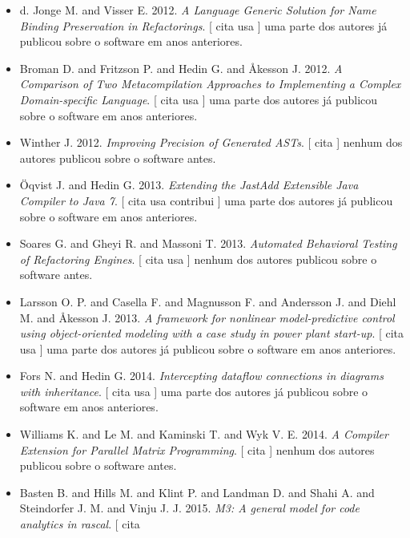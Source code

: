 \begin{itemize}
\item d. Jonge M. and Visser E.
      2012.
        \textit{ A Language Generic Solution for Name Binding Preservation in Refactorings}.
      [
          cita
          usa
      ]
uma parte dos autores já publicou sobre o software em anos anteriores.
\item Broman D. and Fritzson P. and Hedin G. and Åkesson J.
      2012.
        \textit{ A Comparison of Two Metacompilation Approaches to Implementing a Complex Domain-specific Language}.
      [
          cita
          usa
      ]
uma parte dos autores já publicou sobre o software em anos anteriores.
\item Winther J.
      2012.
        \textit{ Improving Precision of Generated ASTs}.
      [
          cita
      ]
nenhum dos autores publicou sobre o software antes.
\item \"{O}qvist J. and Hedin G.
      2013.
        \textit{ Extending the JastAdd Extensible Java Compiler to Java 7}.
      [
          cita
          usa
          contribui
      ]
uma parte dos autores já publicou sobre o software em anos anteriores.
\item Soares G. and Gheyi R. and Massoni T.
      2013.
        \textit{ Automated Behavioral Testing of Refactoring Engines}.
      [
          cita
          usa
      ]
nenhum dos autores publicou sobre o software antes.
\item Larsson O. P. and Casella F. and Magnusson F. and Andersson J. and Diehl M. and Åkesson J.
      2013.
        \textit{ A framework for nonlinear model-predictive control using object-oriented modeling with a case study in power plant start-up}.
      [
          cita
          usa
      ]
uma parte dos autores já publicou sobre o software em anos anteriores.
\item Fors N. and Hedin G.
      2014.
        \textit{ Intercepting dataflow connections in diagrams with inheritance}.
      [
          cita
          usa
      ]
uma parte dos autores já publicou sobre o software em anos anteriores.
\item Williams K. and Le M. and Kaminski T. and Wyk V. E.
      2014.
        \textit{ A Compiler Extension for Parallel Matrix Programming}.
      [
          cita
      ]
nenhum dos autores publicou sobre o software antes.
\item Basten B. and Hills M. and Klint P. and Landman D. and Shahi A. and Steindorfer J. M. and Vinju J. J.
      2015.
        \textit{ M3: A general model for code analytics in rascal}.
      [
          cita

\end{itemize}
